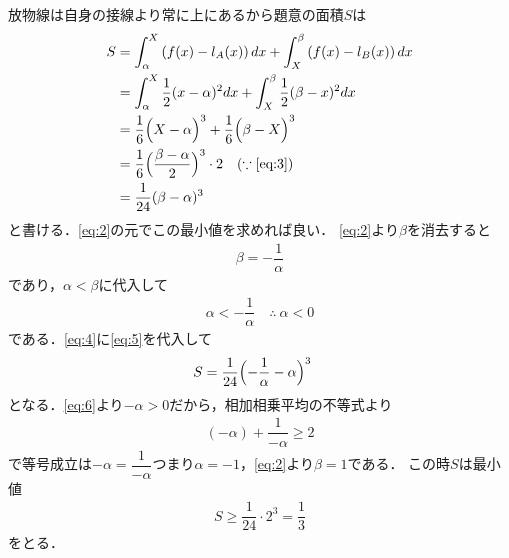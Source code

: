 \documentclass[../../main.tex]{subfiles}
\begin{document}
放物線は自身の接線より常に上にあるから題意の面積$S$は
\begin{align}
  S
  &=\int_\alpha^{X}\left(f(x)-l_A(x)\right) dx+\int_{X}^\beta \left(f(x)-l_B(x)\right) dx \\
  &=\int_\alpha^{X}\dfrac{1}{2}(x-\alpha)^2dx+\int_{X}^\beta\dfrac{1}{2}(\beta-x)^2dx \\
  &=\dfrac{1}{6}\Bigl(X-\alpha\Bigr)^3 + \dfrac{1}{6}\Bigl(\beta-X\Bigr)^3 \\
  &=\dfrac{1}{6}\Bigl(\dfrac{\beta-\alpha}{2}\Bigr)^3\cdot2 \quad (\because\text{\cref{eq:3}})\\
  &=\dfrac{1}{24}(\beta-\alpha)^3 \label{eq:4}
\end{align}
と書ける．\cref{eq:2}の元でこの最小値を求めれば良い．
\cref{eq:2}より$\beta$を消去すると
\begin{align}
  \beta=-\dfrac{1}{\alpha} \label{eq:5}
\end{align}
であり，$\alpha<\beta$に代入して
\begin{align}
  \alpha < -\dfrac{1}{\alpha} \quad \therefore\ \alpha<0 \label{eq:6}
\end{align}
である．\cref{eq:4}に\cref{eq:5}を代入して
\begin{align}
  S
  &=\dfrac{1}{24}\Bigl(-\dfrac{1}{\alpha}-\alpha\Bigr)^3 \label{eq:7}
\end{align}
となる．\cref{eq:6}より$-\alpha>0$だから，相加相乗平均の不等式より
\begin{align}
  (-\alpha)+\dfrac{1}{-\alpha} \ge 2
\end{align}
で等号成立は$-\alpha=\dfrac{1}{-\alpha}$つまり$\alpha=-1$，\cref{eq:2}より$\beta=1$である．
この時$S$は最小値
\begin{align}
  S\ge\dfrac{1}{24}\cdot2^3=\dfrac{1}{3}
\end{align}
をとる．

\newpage
\end{document}

